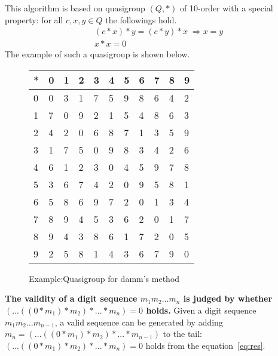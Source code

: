 This algorithm is based on quasigroup $(Q,*)$
of 10-order with a special property:
for all $c,x,y \in Q$ the followings hold.
\begin{align}
 &(c*x)*y = (c*y)*x \;\Rightarrow x = y \label{eq:antiSym1}\\
&x*x = 0 \label{eq:res}
\end{align}
The example of such a quasigroup is shown below.

\begin{figure}[htb]
 \begin{center}
\begin{tabular}{| l || l | l | l | l | l | l | l | l | l | l |}
 \hline
* & 0 & 1 & 2 & 3 & 4 & 5 & 6 & 7 & 8 & 9\\
\hline\hline
0 & 0 & 3 & 1 & 7 & 5 & 9 & 8 & 6 & 4 & 2\\
\hline
1 & 7 & 0 & 9 & 2 & 1 & 5 & 4 & 8 & 6 & 3\\
\hline
2 & 4 & 2 & 0 & 6 & 8 & 7 & 1 & 3 & 5 & 9\\
\hline
3 & 1 & 7 & 5 & 0 & 9 & 8 & 3 & 4 & 2 & 6\\
\hline
4 & 6 & 1 & 2 & 3 & 0 & 4 & 5 & 9 & 7 & 8\\
\hline
5 & 3 & 6 & 7 & 4 & 2 & 0 & 9 & 5 & 8 & 1\\
\hline
6 & 5 & 8 & 6 & 9 & 7 & 2 & 0 & 1 & 3 & 4\\
\hline
7 & 8 & 9 & 4 & 5 & 3 & 6 & 2 & 0 & 1 & 7\\
\hline
8 & 9 & 4 & 3 & 8 & 6 & 1 & 7 & 2 & 0 & 5\\
\hline
9 & 2 & 5 & 8 & 1 & 4 & 3 & 6 & 7 & 9 & 0\\
\hline
\end{tabular}
 \end{center}
\caption{Example:Quasigroup for damm's method}
\label{fig:10digitsQuasi}
\end{figure}
{\bf The validity of a digit sequence $m_1 m_2 ... m_n$ is judged by whether
$(...((0*m_1)*m_2)*...*m_n) = 0 $ holds.}
Given a digit sequence $m_1 m_2...m_{n-1}$,
a valid sequence can be generated by
adding $m_n = (...((0*m_1)*m_2)*...*m_{n-1})$ to the tail:
$(...((0*m_1)*m_2)*...*m_n) = 0 $ holds from the equation~\ref{eq:res}.

